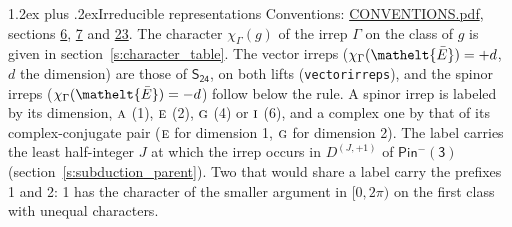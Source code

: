 \documentclass[10pt,a4paper]{article}
\makeatletter
\renewcommand\section{\@startsection{section}{1}{\z@}{-3ex plus -1ex minus -.2ex}%
  {1.2ex plus .2ex}{\normalfont\large\sffamily\bfseries\color{parttitle}}}
\numberwithin{equation}{section}
\newcommand{\eltfont}[1]{{\let\sigma\eltsigma\mathelt{#1}}}
\newcommand{\grp}[1]{\mathsf{#1}}
\newcommand{\irr}[1]{\text{\normalfont\scshape #1}}
\newcommand{\elt}[1]{\eltfont{#1}}
\newcommand{\irrJp}[2]{D^{(#1,#2)}}
\newcommand{\irchar}[1]{\chi_{#1}}
\newcommand{\barred}[1]{\bar{#1}}
\makeatother
\begin{document}
\section{Irreducible representations}\label{s:irreps}
Conventions: \href{../../CONVENTIONS.pdf}{CONVENTIONS.pdf}, sections \href{../../../rotation/CONVENTIONS.pdf\#conv.6}{6}, \href{../../../rotation/CONVENTIONS.pdf\#conv.7}{7} and \href{../../CONVENTIONS.pdf\#conv.23}{23}.
\leavevmode\label{n:function.character}\label{n:irrep.Gamma}The character $\irchar{\Gamma}(g)$ of the irrep $\Gamma$ on the class of $g$ is given in section~\ref{s:character_table}. \label{n:index.dimension}The vector irreps ($\irchar{\Gamma}(\elt{\barred{E}}) = +d$, $d$ the dimension) are those of \href{../../../rotation/data/pdf/S24.pdf}{$\grp{S_{24}}$}, on both lifts (\texttt{vectorirreps}), and the spinor irreps ($\irchar{\Gamma}(\elt{\barred{E}}) = -d$) follow below the rule. A spinor irrep is labeled by its dimension, $\irr{a}$ (1), $\irr{e}$ (2), $\irr{g}$ (4) or $\irr{i}$ (6), and a complex one by that of its complex-conjugate pair ($\irr{e}$ for dimension 1, $\irr{g}$ for dimension 2). The label carries the least half-integer $J$ at which the irrep occurs in $\irrJp{J}{+1}$ of $\grp{Pin^{-}(3)}$ (section~\ref{s:subduction_parent}). Two that would share a label carry the prefixes 1 and 2: 1 has the character of the smaller argument in $[0, 2\pi)$ on the first class with unequal characters.
\end{document}
